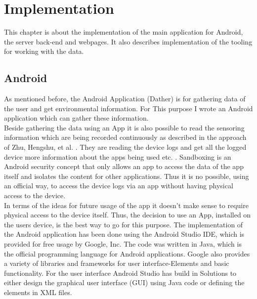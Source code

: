 \chapter{Implementation}

This chapter is about the implementation of the main application for Android, the server back-end and webpages. It also describes implementation of the tooling for working with the data. 

\section{Android}
As mentioned before, the Android Application (Dather) is for gathering data of the user and get environmental information. For This purpose I wrote an Android application which can gather these information.\\ 
Beside gathering the data using an App it is also possible to read the sensoring information which are being recorded continuously as described in the approach of
Zhu, Hengshu, et al. \cite{zhu2015mining}. They are reading the device logs and get all the logged device more information about the apps being used etc. .
Sandboxing is an Android security concept that only allows an app to access the data of the app itself and isolates the content for other applications. Thus it is no possible, using an official way, to access the device logs via an app without having physical access to the device. \\
In terms of the ideas for future usage of the app it doesn't make sense to require physical access to the device itself. Thus, the decision to use an App, installed on the users device, is the best way to go for this purpose.
\bigbreak
The implementation of the Android application has been done using the Android Studio IDE, which is provided for free usage by Google, Inc. The code was written in Java, which is the official programming language for Android applications. Google also provides a variety of libraries and frameworks for user interface-Elements and basic functionality. For the user interface Android Studio has build in Solutions to either design the graphical user interface (GUI) using Java code or defining the elements in XML files. 

